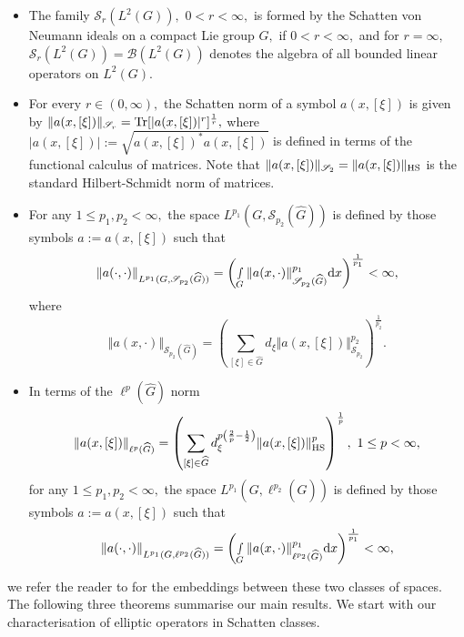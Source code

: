 \documentclass[12pt, reqno]{amsart}
\theoremstyle{definition}
\theoremstyle{remark}
\numberwithin{equation}{section}
\begin{document}
\begin{itemize}
    \item The family $\mathscr{S}_r(L^2(G)),$ $0<r<\infty,$ is formed by the Schatten von Neumann ideals on a compact Lie group $G,$ if $0<r<\infty,$ and for $r=\infty,$ $\mathscr{S}_r(L^2(G))=\mathscr{B}(L^2(G))$ denotes the algebra of all bounded linear operators  on $L^2(G).$
    \item For every $r\in (0,\infty),$ the Schatten norm of a symbol $a(x,[\xi])$ is given by $\Vert a(x,[\xi])\Vert_{\mathscr{S}_r}=\textnormal{Tr}[|a(x,[\xi])|^{r}]^{\frac{1}{r}},$ where $|a(x,[\xi])|:=\sqrt{a(x,[\xi])^*a(x,[\xi])}$ is defined in terms of the functional calculus of matrices. Note that $\Vert a(x,[\xi])\Vert_{\mathscr{S}_2}= \Vert a(x,[\xi])\Vert_{\textnormal{HS}}$ is the standard Hilbert-Schmidt norm of matrices.
    \item For any $1\leq p_1,p_2<\infty,$ the space $L^{p_1}(G,\mathscr{S}_{p_2}(\widehat{G}))$ is defined by those symbols $a:=a(x,[\xi])$ such that 
    $$  \Vert a(\cdot ,\cdot)\Vert_{L^{p_1}(G,\mathscr{S}_{p_2}(\widehat{G}))}=\left(\smallint\limits_G\Vert a(x,\cdot)\Vert_{\mathscr{S}_{p_2}(\widehat{G})}^{p_1}\textnormal{d}x\right)^{\frac{1}{p_1}}<\infty,$$ 
    where $$  \Vert a(x,\cdot)\Vert_{\mathscr{S}_{p_2}(\widehat{G})}= \left(\sum_{[\xi]\in \widehat{G}}d_{\xi}\Vert a(x,[\xi])\Vert_{\mathscr{S}_{p_2}}^{p_2} \right)^{\frac{1}{p_2}}. $$
    \item In terms of the $\ell^p(\widehat{G})$ norm
    \begin{equation}
        \Vert a(x,[\xi])\Vert_{\ell^p(\widehat{G})}=\left(\sum_{[\xi]\in \widehat{G}}d_{\xi}^{p\left(\frac{2}{p}-\frac{1}{2}\right)}\Vert a(x,[\xi])\Vert_{\textnormal{HS}}^{p} \right)^{\frac{1}{p}},\,\,1\leq p<\infty,
    \end{equation} for any $1\leq p_1,p_2<\infty,$ the space $L^{p_1}(G,\ell^{p_2}(\widehat{G}))$ is defined by those symbols $a:=a(x,[\xi])$ such that 
    $$  \Vert a(\cdot,\cdot)\Vert_{L^{p_1}(G,\ell^{p_2}(\widehat{G}))}=\left(\smallint\limits_G\Vert a(x,\cdot)\Vert_{\ell^{p_2}(\widehat{G})}^{p_1}\textnormal{d}x\right)^{\frac{1}{p_1}}<\infty,$$
\end{itemize}we refer the reader to \cite{FischerRuzhanskyBook} for the embeddings between these two classes of spaces. The following three theorems summarise our main results. We start with our characterisation of elliptic operators in Schatten classes.
\end{document}
